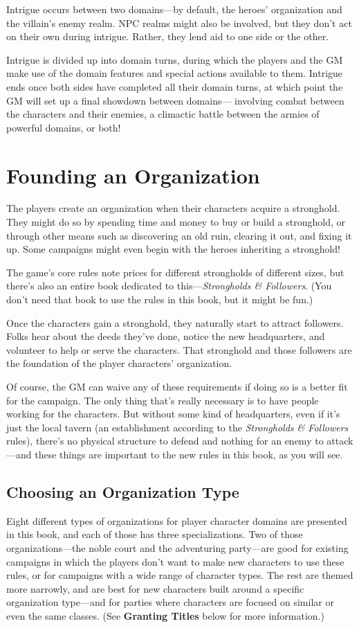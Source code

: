 \documentclass[10pt,a4paper,twoside,bg=print,twocolumn,openany,nodeprecatedcode]{dndbook}
\begin{document}
Intrigue occurs between two domains—by default, the heroes' organization and the villain's enemy realm. NPC realms might also be involved, but they don't act on their own during intrigue. Rather, they lend aid to one side or the other.

Intrigue is divided up into domain turns, during which the players and the GM make use of the domain features and special actions available to them. Intrigue ends once both sides have completed all their domain turns, at which point the GM will set up a final showdown between domains— involving combat between the characters and their enemies, a climactic battle between the armies of powerful domains, or both!

\section{Founding an Organization}
The players create an organization when their characters acquire a stronghold. They might do so by spending time and money to buy or build a stronghold, or through other means such as discovering an old ruin, clearing it out, and fixing it up. Some campaigns might even begin with the heroes inheriting a stronghold!

The game's core rules note prices for different strongholds of different sizes, but there's also an entire book dedicated to this—\textit{Strongholds \& Followers}. (You don't need that book to use the rules in this book, but it might be fun.) 

Once the characters gain a stronghold, they naturally start to attract followers. Folks hear about the deeds they've done, notice the new headquarters, and volunteer to help or serve the characters. That stronghold and those followers are the foundation of the player characters' organization.

Of course, the GM can waive any of these requirements if doing so is a better fit for the campaign. The only thing that's really necessary is to have people working for the characters. But without some kind of headquarters, even if it's just the local tavern (an establishment according to the \textit{Strongholds \& Followers} rules), there's no physical structure to defend and nothing for an enemy to attack—and these things are important to the new rules in this book, as you will see.

\subsection{Choosing an Organization Type}
Eight different types of organizations for player character domains are presented in this book, and each of those has three specializations. Two of those organizations—the noble court and the adventuring party—are good for existing campaigns in which the players don't want to make new characters to use these rules, or for campaigns with a wide range of character types. The rest are themed more narrowly, and are best for new characters built around a specific organization type—and for parties where characters are focused on similar or even the same classes. (See \textbf{Granting Titles} below for more information.)
\end{document}
